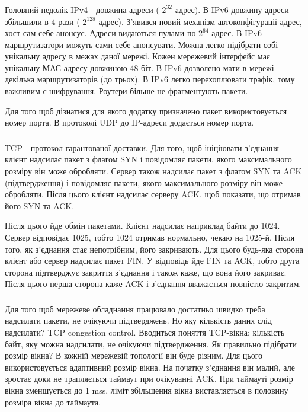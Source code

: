 \documentclass[t]{beamer}  %
\begin{document}
\begin{frame}
 	\frametitle{\insertsection} 
 	\framesubtitle{\insertsubsection}
Головний недолік IPv4 - довжина адреси ( $2^{32}$ адрес). В IPv6 довжину адреси збільшили в 4 рази ( $2^{128}$ адрес). З'явився новий механізм автоконфігурації адрес, хост сам себе анонсує. Адреси видаються пулами по $2^{64}$ адрес. В IPv6 маршрутизатори можуть сами себе анонсувати. Можна легко підібрати собі унікальну адресу в межах даної мережі. Кожен мережевий інтерфейс має унікальну МАС-адресу довжиною 48 біт. В IPv6 дозволено мати в мережі декілька маршрутизаторів (до трьох). В IPv6 легко перехоплювати трафік, тому важливим є шифрування. Роутери більше не фрагментують пакети.

Для того щоб дізнатися для якого додатку призначено пакет використовується номер порта. В протоколі UDP до IP-адреси додається номер порта.
\end{frame}

\begin{frame}
 	\frametitle{\insertsection} 
 	\framesubtitle{\insertsubsection}
TCP - протокол гарантованої доставки. Для того, щоб ініціювати з'єднання клієнт надсилає пакет з флагом SYN і повідомляє пакети, якого максимального розміру він може обробляти. Сервер також надсилає пакет з флагом SYN та ACK (підтвердження) і повідомляє пакети, якого максимального розміру він може обробляти. Після цього клієнт надсилає серверу ACK, щоб показати, що отримав його SYN та ACK.

Після цього йде обмін пакетами. Клієнт  надсилає наприклад байти до 1024. Сервер відповідає 1025, тобто 1024 отримав нормально, чекаю на 1025-й. Після того, як з'єднання стає непотрібним, його закривають. Для цього будь-яка сторона клієнт або сервер надсилає пакет FIN. У відповідь йде FIN та ACK, тобто друга сторона підтверджує закриття з'єднання і також каже, що вона його закриває. Після цього перша сторона каже ACK і з'єднання вважається повністю закритим. 
\end{frame}

\begin{frame}
 	\frametitle{\insertsection} 
 	\framesubtitle{\insertsubsection}
Для того щоб мережеве обладнання працювало достатньо швидко треба надсилати пакети, не очікуючи підтверджень. Но яку кількість даних слід надсилати? TCP congestion control. Вводиться поняття TCP-вікна: кількість байт, яку можна надсилати, не очікуючи підтвердження. Як правильно підібрати розмір вікна? В кожній мережевій топології він буде різним. Для цього використовується адаптивний розмір вікна. На початку з'єднання він малий, але зростає доки не трапляється таймаут при очікуванні ACK. При таймауті розмір вікна зменшується до 1 mss, ліміт збільшення вікна виставляється в половину розміра вікна до таймаута.
\end{frame}
\end{document}
